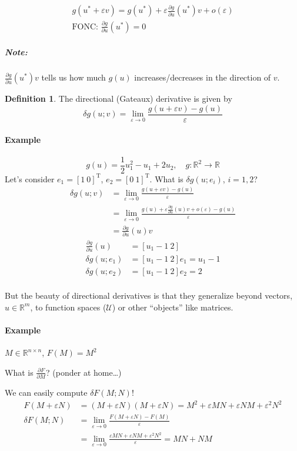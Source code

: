 \documentclass[letterpaper,12pt,titlepage]{report}
\newcommand{\trans}{^\text{T}}
\newcommand*\pder[2]{\frac{\partial #1}{\partial #2}}
\newcommand*\R{\mathbb{R}}
\theoremstyle{plain}
\theoremstyle{definition}
\newtheorem*{defi}{Definition}
\begin{document}
\begin{gather}
  g(u^* + \varepsilon v) = g(u^*) + \varepsilon \pder{g}{u}(u^*) v + o(\varepsilon) \\
  \text{FONC: } \pder{g}{u}(u^*) = 0 \hspace{3cm} 
\end{gather}

\subparagraph{Note:} $\pder{g}{u}(u^*) v$ tells us how much $g(u)$ increases/decreases in the direction of $v$.

\begin{defi}
  The directional (Gateaux) derivative is given by
  \[ \delta g(u;v) = \lim_{\varepsilon\to0} \frac{g(u+\varepsilon v)-g(u)}{\varepsilon} \]
\end{defi}

\paragraph{Example}
\[ g(u) = \frac12 u_1^2 - u_1 + 2u_2, \quad g:\R^2\to\R \]
Let's consider $e_1=[1\ 0]\trans$, $e_2=[0\ 1]\trans$. What is $\delta g(u;e_i)$, $i=1,2$?
\begin{align}
  \delta g(u;v) &= \lim_{\varepsilon\to0} \frac{g(u+\varepsilon v)-g(u)}{\varepsilon} \\
                &= \lim_{\varepsilon\to0} \frac{g(u)+\varepsilon\pder{g}{u}(u) v + o(\varepsilon) - g(u)}{\varepsilon} \\
                &= \pder{g}{u} (u) v
\end{align}
\begin{align}
  \pder{g}{u}(u) &= [u_1-1\ 2] \\
  \delta g(u;e_1) &= [u_1-1\ 2] e_1 = u_1-1 \\
  \delta g(u;e_2) &= [u_1-1\ 2] e_2 = 2 \\
\end{align}

But the beauty of directional derivatives is that they generalize beyond vectors, $u\in\R^m$, to function spaces ($\mathcal U$) or other ``objects'' like matrices.

\paragraph{Example} $M\in\R^{n\times n}$, $F(M)=M^2$

What is $\pder{F}{M}$? (ponder at home\dots)

We can easily compute $\delta F(M;N)$!
\begin{align}
  F(M+\varepsilon N) &= (M+\varepsilon N)(M+\varepsilon N) = M^2 + \varepsilon M N + \varepsilon N M + \varepsilon^2 N^2 \\
  \delta F(M;N) &= \lim_{\varepsilon\to0} \frac{F(M+\varepsilon N)-F(M)}{\varepsilon} \\
                  &= \lim_{\varepsilon\to0} \frac{\varepsilon M N + \varepsilon N M + \varepsilon^2 N^2}{\varepsilon} = MN + NM
\end{align}
\end{document}
